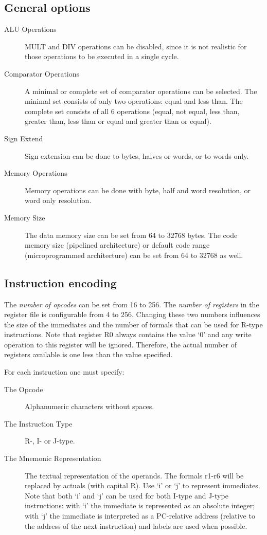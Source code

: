 \documentclass{article}
\begin{document}
\subsection{General options}

\begin{description}
\item[ALU Operations] MULT and DIV operations can be disabled, since it is not realistic for those operations to be executed in a single cycle.
\item[Comparator Operations] A minimal or complete set of 
comparator operations can be selected. The minimal set consists of only 
two operations: equal and less than. The complete set consists of all 6 
operations (equal, not equal, less than, greater than, less than or 
equal and greater than or equal).
\item[Sign Extend] Sign extension can be done to bytes, halves or words, or to words only.
\item[Memory Operations] Memory operations can be done with byte, half and word resolution, or word only resolution.
\item[Memory Size] The data memory size can be set from 64 to 
32768 bytes. The code memory size (pipelined architecture) or default 
code range (microprogrammed architecture) can be set from 64 to 32768 as
 well.
\end{description}

\subsection{Instruction encoding}
The \emph{number of opcodes} can be set from 16 to 256. The \emph{number of registers} in the register file is
configurable from 4 to 256. Changing these two numbers influences the size of the immediates and the number of formals
that can be used for R-type instructions. Note that register R0 always contains the value `0' and any write operation to
this register will be ignored. Therefore, the actual number of registers available is one less than the value specified.

For each instruction one must specify:
\begin{description}
\item[The Opcode] Alphanumeric characters without spaces.
\item[The Instruction Type] R-, I- or J-type.
\item[The Mnemonic Representation] The textual representation 
of the operands. The formals r1-r6 will be replaced by actuals (with 
capital R). Use `i' or `j' to represent immediates. Note that both `i' 
and `j' can be used for both I-type and J-type instructions: with `i' 
the immediate is represented as an absolute integer; with `j' the 
immediate is interpreted as a PC-relative address (relative to the 
address of the next instruction) and labels are used when possible.
\end{description}
\end{document}
